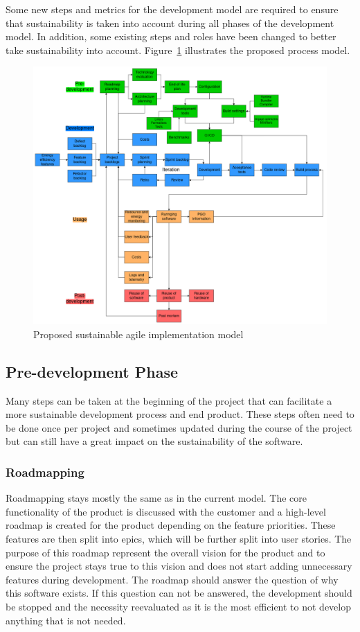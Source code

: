 Some new steps and metrics for the development model are required to ensure that sustainability is taken into account during all phases of the development model. In addition, some existing steps and roles have been changed to better take sustainability into account. Figure~\ref{greenagile} illustrates the proposed process model.

\begin{figure}[H]
\caption{Proposed sustainable agile implementation model}
\label{greenagile}
\includegraphics[width=\textwidth]{images/greenagile.png}
\centering
\end{figure}

\subsection{Pre-development Phase}
Many steps can be taken at the beginning of the project that can facilitate a more sustainable development process and end product. These steps often need to be done once per project and sometimes updated during the course of the project but can still have a great impact on the sustainability of the software.

\subsubsection{Roadmapping}
Roadmapping stays mostly the same as in the current model. The core functionality of the product is discussed with the customer and a high-level roadmap is created for the product depending on the feature priorities. These features are then split into epics, which will be further split into user stories. The purpose of this roadmap represent the overall vision for the product and to ensure the project stays true to this vision and does not start adding unnecessary features during development. The roadmap should answer the question of why this software exists. If this question can not be answered, the development should be stopped and the necessity reevaluated as it is the most efficient to not develop anything that is not needed. 

